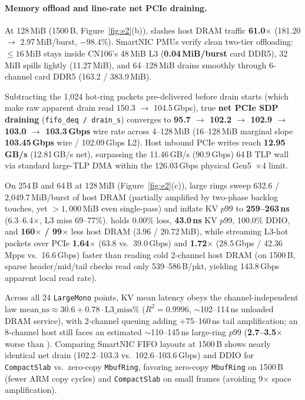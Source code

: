 \paragraph{Memory offload and line-rate net PCIe draining.}
At 128\,MiB (1500\,B, Figure~\ref{fig:e2}(b)), \sys{} slashes host DRAM traffic
\textbf{61.0$\times$} (181.20 $\to$ 2.97\,MiB/burst, $-98.4\%$). SmartNIC PMUs
verify clean two-tier offloading: $\le 16$\,MiB stays inside CN106's 48\,MiB L3
(\textbf{0.04\,MiB/burst} card DDR5), 32\,MiB spills lightly (11.27\,MiB), and
64--128\,MiB drains smoothly through 6-channel card DDR5 (163.2 / 383.9\,MiB).

Subtracting the 1,024 hot-ring packets pre-delivered before drain starts
(which make raw apparent drain read 150.3 $\to$ 104.5\,Gbps), true \textbf{net
PCIe SDP draining} (\texttt{fifo\_deq / drain\_s}) converges to
\textbf{95.7 $\to$ 102.2 $\to$ 102.9 $\to$ 103.0 $\to$ 103.3\,Gbps} wire rate
across 4--128\,MiB (16--128\,MiB marginal slope \textbf{103.45\,Gbps} wire /
102.09\,Gbps L2). Host inbound PCIe writes reach \textbf{12.95\,GB/s}
(12.81\,GB/s net), surpassing the 11.46\,GB/s (90.9\,Gbps) 64\,B TLP wall via
standard large-TLP DMA within the 126.03\,Gbps physical Gen5~$\times 4$ limit.

On 254\,B and 64\,B at 128\,MiB (Figure~\ref{fig:e2}(c)), large rings sweep
632.6 / 2,049.7\,MiB/burst of host DRAM (partially amplified by two-phase
backlog touches, yet $>1{,}000$\,MiB even single-pass) and inflate KV $p99$ to
\textbf{259--263\,ns} (6.3--6.4$\times$, L3 miss 69--77\%). \sys{} holds 0.00\%
loss, \textbf{43.0\,ns} KV $p99$, 100.0\% DDIO, and \textbf{160$\times$ /
99$\times$} less host DRAM (3.96 / 20.72\,MiB), while streaming L3-hot packets
over PCIe \textbf{1.64$\times$} (63.8 vs.\ 39.0\,Gbps) and \textbf{1.72$\times$}
(28.5\,Gbps / 42.36\,Mpps vs.\ 16.6\,Gbps) faster than reading cold 2-channel
host DRAM (on 1500\,B, sparse header/mid/tail checks read only 539--586\,B/pkt,
yielding 143.8\,Gbps apparent local read rate).

Across all 24 \texttt{LargeMono} points, KV mean latency obeys the
channel-independent law $\text{mean\_ns} \approx 30.6 + 0.78 \cdot \text{L3\_miss\%}$
($R^2 = 0.9996$, $\sim$102--114\,ns unloaded DRAM service), with 2-channel
queuing adding +75--160\,ns tail amplification; an 8-channel host still faces
an estimated $\sim$110--145\,ns large-ring $p99$ (\textbf{2.7--3.5$\times$}
worse than \sys{}). Comparing SmartNIC FIFO layouts at 1500\,B shows nearly
identical net drain (102.2--103.3 vs.\ 102.6--103.6\,Gbps) and DDIO for
\texttt{CompactSlab} vs.\ zero-copy \texttt{MbufRing}, favoring zero-copy
\texttt{MbufRing} on 1500\,B (fewer ARM copy cycles) and \texttt{CompactSlab}
on small frames (avoiding 9$\times$ space amplification).

